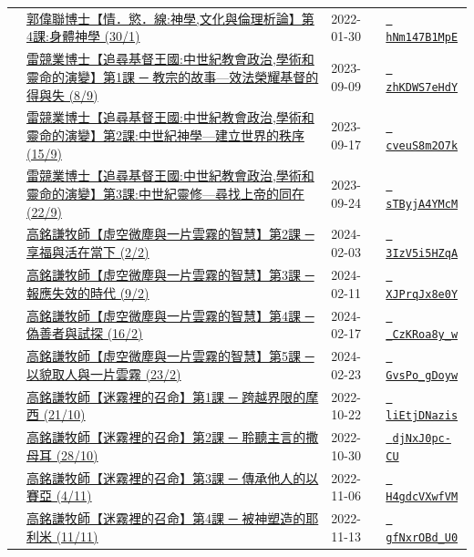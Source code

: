 \documentclass{book}
\begin{document}
{\begin{xltabular}{\textwidth}{|p{0.15\textwidth} p{0.6\textwidth}|p{0.07\textwidth} p{0.1\textwidth}|}
    & \hyperref[sec:hNm147B1MpE]{郭偉聯博士【情．慾．線:神學,文化與倫理析論】第4課:身體神學 (30/1)} & 2022-01-30 & \href{https://youtube.com/watch?v=hNm147B1MpE}{\texttt{ hNm147B1MpE}} \\
    & \hyperref[sec:zhKDWS7eHdY]{雷競業博士【追尋基督王國:中世紀教會政治,學術和靈命的演變】第1課 ─ 教宗的故事—效法榮耀基督的得與失 (8/9)} & 2023-09-09 & \href{https://youtube.com/watch?v=zhKDWS7eHdY}{\texttt{ zhKDWS7eHdY}} \\
    & \hyperref[sec:cveuS8m2O7k]{雷競業博士【追尋基督王國:中世紀教會政治,學術和靈命的演變】第2課:中世紀神學—建立世界的秩序 (15/9)} & 2023-09-17 & \href{https://youtube.com/watch?v=cveuS8m2O7k}{\texttt{ cveuS8m2O7k}} \\
    & \hyperref[sec:sTByjA4YMcM]{雷競業博士【追尋基督王國:中世紀教會政治,學術和靈命的演變】第3課:中世紀靈修—尋找上帝的同在 (22/9)} & 2023-09-24 & \href{https://youtube.com/watch?v=sTByjA4YMcM}{\texttt{ sTByjA4YMcM}} \\
    & \hyperref[sec:3IzV5i5HZqA]{高銘謙牧師【虛空微塵與一片雲霧的智慧】第2課 ─ 享福與活在當下 (2/2)} & 2024-02-03 & \href{https://youtube.com/watch?v=3IzV5i5HZqA}{\texttt{ 3IzV5i5HZqA}} \\
    & \hyperref[sec:XJPrqJx8e0Y]{高銘謙牧師【虛空微塵與一片雲霧的智慧】第3課 ─ 報應失效的時代 (9/2)} & 2024-02-11 & \href{https://youtube.com/watch?v=XJPrqJx8e0Y}{\texttt{ XJPrqJx8e0Y}} \\
    & \hyperref[sec:_CzKRoa8y_w]{高銘謙牧師【虛空微塵與一片雲霧的智慧】第4課 ─ 偽善者與試探 (16/2)} & 2024-02-17 & \href{https://youtube.com/watch?v=_CzKRoa8y_w}{\texttt{ \_CzKRoa8y\_w}} \\
    & \hyperref[sec:GvsPo_gDoyw]{高銘謙牧師【虛空微塵與一片雲霧的智慧】第5課 ─ 以貌取人與一片雲霧 (23/2)} & 2024-02-23 & \href{https://youtube.com/watch?v=GvsPo_gDoyw}{\texttt{ GvsPo\_gDoyw}} \\
    & \hyperref[sec:liEtjDNazis]{高銘謙牧師【迷霧裡的召命】第1課 ─ 跨越界限的摩西 (21/10)} & 2022-10-22 & \href{https://youtube.com/watch?v=liEtjDNazis}{\texttt{ liEtjDNazis}} \\
    & \hyperref[sec:djNxJ0pc_CU]{高銘謙牧師【迷霧裡的召命】第2課 ─ 聆聽主言的撒母耳 (28/10)} & 2022-10-30 & \href{https://youtube.com/watch?v=djNxJ0pc-CU}{\texttt{ djNxJ0pc-CU}} \\
    & \hyperref[sec:H4gdcVXwfVM]{高銘謙牧師【迷霧裡的召命】第3課 ─ 傳承他人的以賽亞 (4/11)} & 2022-11-06 & \href{https://youtube.com/watch?v=H4gdcVXwfVM}{\texttt{ H4gdcVXwfVM}} \\
    & \hyperref[sec:gfNxrOBd_U0]{高銘謙牧師【迷霧裡的召命】第4課 ─ 被神塑造的耶利米 (11/11)} & 2022-11-13 & \href{https://youtube.com/watch?v=gfNxrOBd_U0}{\texttt{ gfNxrOBd\_U0}} \\

\end{xltabular}}
\end{document}
